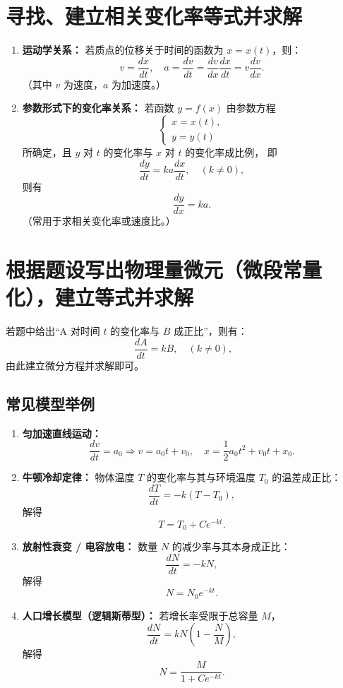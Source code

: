 
\section{寻找、建立相关变化率等式并求解}

\begin{enumerate}
    \item \textbf{运动学关系：}
          若质点的位移关于时间的函数为 $x=x(t)$，则：
          \[
              v = \frac{dx}{dt}, \quad
              a = \frac{dv}{dt} = \frac{dv}{dx}\frac{dx}{dt} = v\frac{dv}{dx}.
          \]
          （其中 $v$ 为速度，$a$ 为加速度。）

    \item \textbf{参数形式下的变化率关系：}
          若函数 $y=f(x)$ 由参数方程
          \[
              \begin{cases}
                  x = x(t), \\
                  y = y(t)
              \end{cases}
          \]
          所确定，且 $y$ 对 $t$ 的变化率与 $x$ 对 $t$ 的变化率成比例，
          即
          \[
              \frac{dy}{dt} = k a \frac{dx}{dt}, \quad (k \neq 0),
          \]
          则有
          \[
              \frac{dy}{dx} = k a.
          \]
          （常用于求相关变化率或速度比。）
\end{enumerate}

\section{根据题设写出物理量微元（微段常量化），建立等式并求解}

若题中给出“A 对时间 $t$ 的变化率与 $B$ 成正比”，则有：
\[
    \frac{dA}{dt} = kB, \quad (k \neq 0),
\]
由此建立微分方程并求解即可。

\subsection*{常见模型举例}
\begin{enumerate}
    \item \textbf{匀加速直线运动：}
          \[
              \frac{dv}{dt} = a_0 \Rightarrow v = a_0t + v_0, \quad x = \frac{1}{2}a_0t^2 + v_0t + x_0.
          \]
    \item \textbf{牛顿冷却定律：}
          物体温度 $T$ 的变化率与其与环境温度 $T_0$ 的温差成正比：
          \[
              \frac{dT}{dt} = -k(T - T_0),
          \]
          解得
          \[
              T = T_0 + Ce^{-kt}.
          \]
    \item \textbf{放射性衰变 / 电容放电：}
          数量 $N$ 的减少率与其本身成正比：
          \[
              \frac{dN}{dt} = -kN,
          \]
          解得
          \[
              N = N_0 e^{-kt}.
          \]
    \item \textbf{人口增长模型（逻辑斯蒂型）：}
          若增长率受限于总容量 $M$，
          \[
              \frac{dN}{dt} = kN\left(1-\frac{N}{M}\right),
          \]
          解得
          \[
              N = \frac{M}{1+Ce^{-kt}}.
          \]
\end{enumerate}

